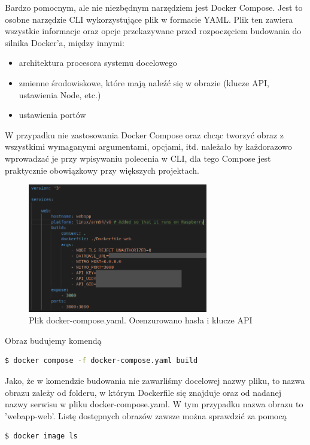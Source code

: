 Bardzo pomocnym, ale nie niezbędnym narzędziem jest Docker Compose. Jest to osobne narzędzie CLI wykorzystujące plik w formacie YAML. Plik ten zawiera wszystkie informacje
oraz opcje przekazywane przed rozpoczęciem budowania do silnika Docker'a, między innymi: 
\begin{itemize}
    \item architektura procesora systemu docelowego
    \item zmienne środowiskowe, które mają naleźć się w obrazie (klucze API, ustawienia Node, etc.)
    \item ustawienia portów
\end{itemize}

W przypadku nie zastosowania Docker Compose oraz chcąc tworzyć obraz z wszystkimi wymaganymi argumentami, opcjami, itd. należało by każdorazowo wprowadzać je przy wpisywaniu
polecenia w CLI, dla tego Compose jest praktycznie obowiązkowy przy większych projektach.

\begin{figure}[H]
    \centering
    \includegraphics[width=0.7\textwidth]{zdj/compose_1_cenz.png}
    \caption{Plik docker-compose.yaml. Ocenzurowano hasła i klucze API}
\end{figure}

Obraz budujemy komendą
\begin{lstlisting}[language=bash]
    $ docker compose -f docker-compose.yaml build
\end{lstlisting}

Jako, że w komendzie budowania nie zawarliśmy docelowej nazwy pliku, to nazwa obrazu zależy od folderu, w którym Dockerfile się znajduje oraz od nadanej
nazwy serwisu w pliku docker-compose.yaml. W tym przypadku nazwa obrazu to 'webapp-web'. Listę dostępnych obrazów zawsze można sprawdzić za pomocą 

\begin{lstlisting}[language=bash, label={lst:image-ls}]
    $ docker image ls
\end{lstlisting}

